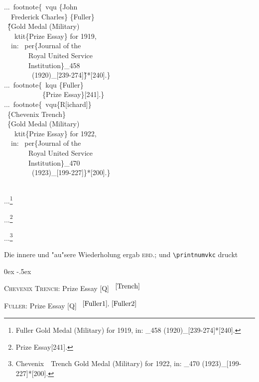 \documentclass[12pt,a4paper]{article}
\newcommand{\pbs}{\string\ \unskip}
\newcommand{\bs}{\protect\pbs}
\begin{document}
\Doppelbox
{
...\bs footnote\{\bs vqu \{John 
\\ \ \ Frederick Charles\} \{Fuller\} 
\\ \ \H{\{}Gold Medal (Military) 
\\ \ \ \bs ktit\{Prize Essay\} for 1919, 
\\ \ \ in: \bs per\{Journal of the
\\ \ \ \ \ \ \ \ Royal United Service 
\\ \ \ \ \ \ \ \ Institution\}\string_458 
\\ \ \ \ \ \ \ \ \ (1920)\string_[239-274]\H{\}}*[240].\}
\\[1.5ex]
...\bs footnote\{\bs kqu \{Fuller\} 
\\ \ \ \ \ \ \ \ \ \ \ \ \{Prize Essay\}[241].\}
\\[1.5ex]
...\bs footnote\{\bs vqu\{R[ichard]\} 
\\ \ \{Chevenix Trench\} 
\\ \ \{Gold Medal (Military) 
\\ \ \ \bs ktit\{Prize Essay\} for 1922, 
\\ \ \ in: \bs per\{Journal of the 
\\ \ \ \ \ \ \ \ Royal United Service 
\\ \ \ \ \ \ \ \ Institution\}\string_470 
\\ \ \ \ \ \ \ \ \ (1923)\string_[199-227]\}*[200].\}
}
{\notktitaddtok
{}
\\[1.5ex]
...\footnote{ {Fuller} 
{Gold Medal (Military)  for 1919, 
in: _458 (1920)_[239-274]}*[240].\label{noNr}\label{Fuller1}}

...\footnote{ 
{Prize Essay}[241].\label{Fuller2}}

...\footnote{ {Chevenix\ \ Trench} 
{Gold Medal (Military)  for 1922, 
in: _470 (1923)_[199-227]}*[200].\label{Trench}}
}

\noindent
Die innere und "au"sere Wiederholung ergab \textsc{ebd.};
und \verb|\printnumvkc| druckt

\vspace{-0.4ex}
{\small\begin{description}\parsep 0ex \itemsep -.5ex
\item \textsc{Chevenix Trench}: Prize Essay [Q] \ \textsf{\pageref{Trench}$^{\ref{Trench}}$}
\item \textsc{Fuller}: Prize Essay [Q] \ \textsf{\pageref{Fuller1}$^{\ref{Fuller1},\ \ref{Fuller2}}$}
\end{description}}
\end{document}
